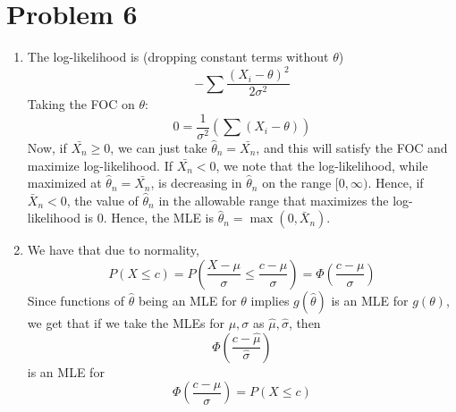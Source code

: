 \documentclass[10pt,letter]{article}
\begin{document}
\section*{Problem 6}
\begin{enumerate}[label=(\alph*)]
\item The log-likelihood is (dropping constant terms without $\theta$)
\[ - \sum \frac{(X_i - \theta)^2}{2\sigma^2} \]
Taking the FOC on $\theta$:
\[ 0 = \frac{1}{\sigma^2} \left( \sum (X_i - \theta) \right) \]
Now, if $\bar{X_n} \ge 0$, we can just take $\hat{\theta}_n = \bar{X_n}$, and this will satisfy the FOC and maximize log-likelihood. If $\bar{X_n} < 0$, we note that the log-likelihood, while maximized at $\hat{\theta}_n = \bar{X_n}$, is decreasing in $\hat{\theta}_n$ on the range $[0, \infty)$. Hence, if $\bar{X}_n < 0$, the value of $\hat{\theta}_n$ in the allowable range that maximizes the log-likelihood is 0. Hence, the MLE is $\hat{\theta}_n= \max (0, \bar{X}_n)$.
\item We have that due to normality,
\[ P(X \le c) = P\left( \frac{X - \mu}{\sigma} \le \frac{c-\mu}{\sigma}\right) = \Phi\left( \frac{c-\mu}{\sigma}\right) \]
Since functions of $\hat{\theta}$ being an MLE for $\theta$ implies $g(\hat{\theta})$ is an MLE for $g(\theta)$, we get that if we take the MLEs for $\mu, \sigma$ as $\hat{\mu}, \hat{\sigma}$, then
\[ \Phi\left(\frac{c - \hat{\mu}}{\hat{\sigma}}\right) \]
is an MLE for
\[  \Phi\left( \frac{c-\mu}{\sigma}\right) = P(X \le c)  \]
\end{enumerate}
\end{document}
